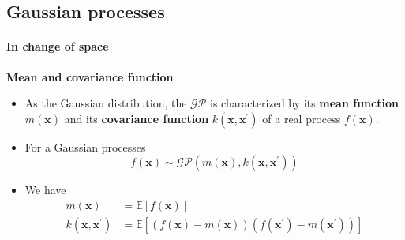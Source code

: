 \subsection{Gaussian processes}
\begin{frame}{\insertsubsection}
    \framesubtitle{In change of space}

    \textcolor{UniGold}{\textbf{Mean and covariance function}}
    \begin{itemize}
        \item As the Gaussian distribution, the $\mathcal{GP}$ is characterized by its \textcolor{UniOrange}{\textbf{mean function}} $m(\mathbf{x})$ and its \textcolor{UniOrange}{\textbf{covariance function}} $k(\mathbf{x,x}^{\prime})$ of a real process $f(\mathbf{x})$.
    \item For a Gaussian processes
    \begin{equation*}
        f(\mathbf{x})  \sim \mathcal{G} \mathcal{P}\left(m(\mathbf{x}), k\left(\mathbf{x}, \mathbf{x}^{\prime}\right)\right)
    \end{equation*}
    \item We have
    \begin{equation*}
        \begin{aligned} m(\mathbf{x}) &=\mathbb{E}[f(\mathbf{x})] \\ k\left(\mathbf{x}, \mathbf{x}^{\prime}\right) &=\mathbb{E}\left[(f(\mathbf{x})-m(\mathbf{x}))\left(f\left(\mathbf{x}^{\prime}\right)-m\left(\mathbf{x}^{\prime}\right)\right)\right] \end{aligned}        
    \end{equation*}
    \end{itemize}
\end{frame}